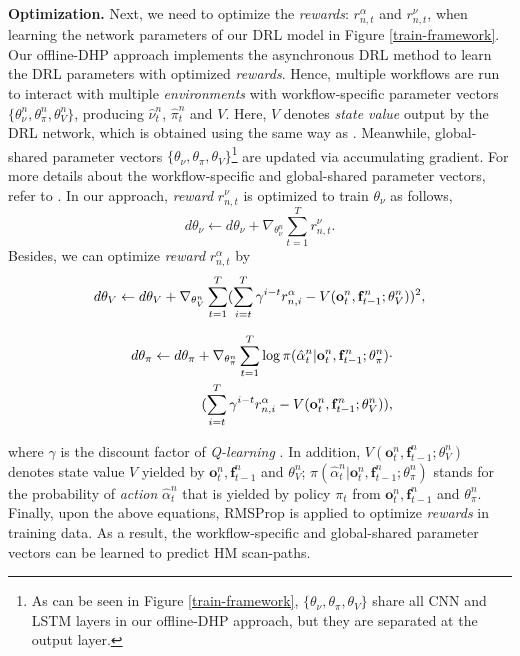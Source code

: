 \documentclass[10pt,journal,compsoc]{IEEEtran}
\begin{document}
\textbf{Optimization.}
Next, we need to optimize the \textit{rewards}: $r^{\alpha}_{n,t}$ and $r^{\nu}_{n,t}$, when learning the network parameters of our DRL model in Figure \ref{train-framework}.
Our offline-DHP approach implements the asynchronous DRL method \cite{mnih2016asynchronous} to learn the DRL parameters with optimized \textit{rewards}.
Hence, multiple workflows are run to interact with multiple \textit{environments} with workflow-specific parameter vectors $\{ \theta^{n}_{\nu}, \theta^{n}_{\pi}, \theta^{n}_{V} \}$, producing $\hat{\nu}^n_t$, $\hat{\pi}^n_t$ and $V$.
Here, $V$ denotes \textit{state value} output by the DRL network, which is obtained using the same way as \cite{mnih2016asynchronous}.
Meanwhile, global-shared parameter vectors $\{ \theta_{\nu}, \theta_{\pi}, \theta_{V} \}$\footnote{As can be seen in Figure \ref{train-framework}, $\{ \theta_{\nu}, \theta_{\pi}, \theta_{V} \}$ share all CNN and LSTM layers in our offline-DHP approach, but they are separated at the output layer.} are updated via accumulating gradient.
For more details about the workflow-specific and global-shared parameter vectors, refer to \cite{mnih2016asynchronous}.
In our approach, \textit{reward} $r^{\nu}_{n,t}$ is optimized to train $\theta_{\nu}$ as follows,
\begin{equation}
\label{opt-1}
d \theta_{\nu} \leftarrow d \theta_{\nu} + \nabla_{\theta_{\nu}^{n}} \sum_{t=1}^{T} r^{\nu}_{n,t}.
\end{equation}
Besides, we can optimize \textit{reward} $r^{\alpha}_{n,t}$ by
\begin{equation}
\label{opt-2}
\small d \theta_{V} \leftarrow d \theta_{V} + \nabla_{\theta_{V}^{n}} \sum_{t = 1}^{T} (\sum_{i=t}^{T} \gamma^{i-t} r^{\alpha}_{n,i} - V(\mathbf{o}^n_{t}, \mathbf{f}^n_{t-1} ; \theta_{V}^{n}))^2,
\end{equation}
\begin{small}
\begin{eqnarray}
\label{opt-3}
\hspace{0.1cm} \nonumber d \theta_{\pi} \leftarrow d \theta_{\pi} +\nabla_{\theta_{\pi}^{n}} \sum_{t = 1}^{T} \log \pi( \hat{\alpha}^n_{t} | \mathbf{o}^n_{t}, \mathbf{f}^n_{t-1} ; \theta_{\pi}^{n})\cdot \\
(\sum_{i = t}^{T} \gamma^{i-t} r^{\alpha}_{n,i} - V(\mathbf{o}^n_{t}, \mathbf{f}^n_{t-1} ; \theta_{V}^{n})),
\end{eqnarray}
\end{small}
where $\gamma$ is the discount factor of \textit{Q-learning} \cite{watkins1992q}.
In addition, $V(\mathbf{o}^n_{t}, \mathbf{f}^n_{t-1} ; \theta_{V}^{n})$ denotes state value $V$ yielded by $\mathbf{o}^n_{t}, \mathbf{f}^n_{t-1}$ and $\theta_{V}^{n}$; $\pi( \hat{\alpha}^n_{t} | \mathbf{o}^n_{t}, \mathbf{f}^n_{t-1} ; \theta_{\pi}^{n})$ stands for the probability of \textit{action} $\hat{\alpha}^n_{t}$ that is yielded by policy $\pi_t$ from $\mathbf{o}^n_{t}, \mathbf{f}^n_{t-1}$ and $\theta_{\pi}^{n}$.
Finally, upon the above equations, RMSProp \cite{tieleman2012lecture} is applied to optimize \textit{rewards} in training data. As a result, the workflow-specific and global-shared parameter vectors can be learned to predict HM scan-paths.
\end{document}
